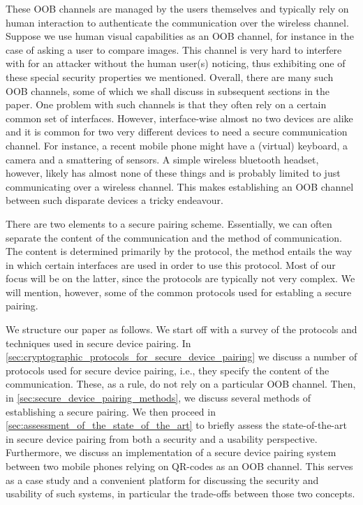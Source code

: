 \documentclass[conference, 11pt]{sty/IEEEtran}
\begin{document}
These OOB channels are managed by the users themselves and typically rely on human interaction to authenticate the communication over the wireless channel.
Suppose we use human visual capabilities as an OOB channel, for instance in the case of asking a user to compare images.
This channel is very hard to interfere with for an attacker without the human user(s) noticing, thus exhibiting one of these special security properties we mentioned.
Overall, there are many such OOB channels, some of which we shall discuss in subsequent sections in the paper.
One problem with such channels is that they often rely on a certain common set of interfaces.
However, interface-wise almost no two devices are alike and it is common for two very different devices to need a secure communication channel.
For instance, a recent mobile phone might have a (virtual) keyboard, a camera and a smattering of sensors.
A simple wireless bluetooth headset, however, likely has almost none of these things and is probably limited to just communicating over a wireless channel.
This makes establishing an OOB channel between such disparate devices a tricky endeavour.

There are two elements to a secure pairing scheme.
Essentially, we can often separate the content of the communication and the method of communication.
The content is determined primarily by the protocol, the method entails the way in which certain interfaces are used in order to use this protocol.
Most of our focus will be on the latter, since the protocols are typically not very complex.
We will mention, however, some of the common protocols used for establing a secure pairing.

We structure our paper as follows.
We start off with a survey of the protocols and techniques used in secure device pairing.
In \autoref{sec:cryptographic_protocols_for_secure_device_pairing} we discuss a number of protocols used for secure device pairing, i.e., they specify the content of the communication.
These, as a rule, do not rely on a particular OOB channel.
Then, in \autoref{sec:secure_device_pairing_methods}, we discuss several methods of establishing a secure pairing.
We then proceed in \autoref{sec:assessment_of_the_state_of_the_art} to briefly assess the state-of-the-art in secure device pairing from both a security and a usability perspective.
Furthermore, we discuss an implementation of a secure device pairing system between two mobile phones relying on QR-codes as an OOB channel.
This serves as a case study and a convenient platform for discussing the security and usability of such systems, in particular the trade-offs between those two concepts.
\end{document}
